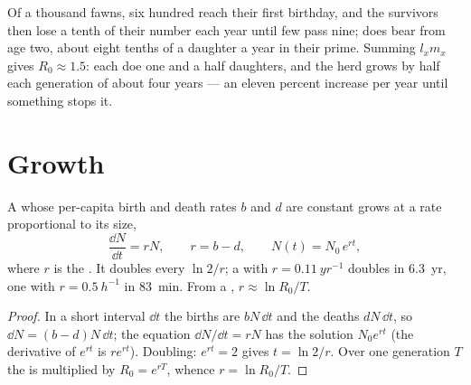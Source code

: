 \begin{example}\label{ex:b1:populations:deer}
Of a thousand fawns, six hundred reach their first birthday, and the
survivors then lose a tenth of their number each year until few pass
nine; does bear from age two, about eight tenths of a daughter a year
in their prime. Summing $l_x m_x$ gives $R_0 \approx 1.5$: each doe
 one and a half daughters, and the herd grows by half each
generation of about four years --- an eleven percent increase per
year until something stops it.
\end{example}

\section{Growth}

\begin{theorem}\label{thm:b1:populations:exponential}
A  whose per-capita birth and death rates $b$ and $d$ are
constant grows at a rate proportional to its size,
\[
\frac{\dd N}{\dd t} = rN, \qquad r = b - d, \qquad N(t) = N_0\,e^{rt},
\]
where $r$ is the \emph{}. It doubles every
$\ln 2/r$; a  with $r = \qty{0.11}{yr^{-1}}$ doubles in
\qty{6.3}{yr}, one with $r = \qty{0.5}{h^{-1}}$ in \qty{83}{min}.
From a , $r \approx \ln R_0 / T$.
\end{theorem}
\begin{proof}
In a short interval $\dd t$ the births are $bN\,\dd t$ and the deaths
$dN\,\dd t$, so $\dd N = (b - d)N\,\dd t$; the equation
$\dd N/\dd t = rN$ has the solution $N_0 e^{rt}$ (the derivative of
$e^{rt}$ is $re^{rt}$). Doubling: $e^{rt} = 2$ gives $t = \ln 2/r$. Over
one generation $T$ the  is multiplied by $R_0 = e^{rT}$,
whence $r = \ln R_0/T$.
\end{proof}

